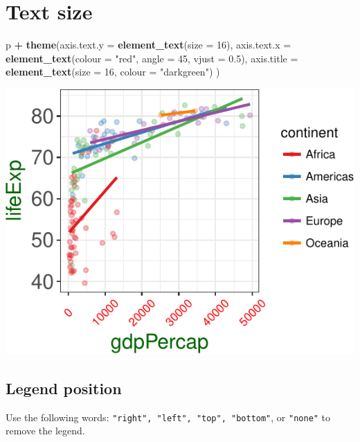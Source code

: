 \documentclass[12pt,]{krantz}
\makeatletter
\newenvironment{Shaded}{\begin{snugshade}}{\end{snugshade}}
\newcommand{\DataTypeTok}[1]{\textcolor[rgb]{0.13,0.29,0.53}{#1}}
\newcommand{\DecValTok}[1]{\textcolor[rgb]{0.00,0.00,0.81}{#1}}
\newcommand{\FloatTok}[1]{\textcolor[rgb]{0.00,0.00,0.81}{#1}}
\newcommand{\KeywordTok}[1]{\textcolor[rgb]{0.13,0.29,0.53}{\textbf{#1}}}
\newcommand{\NormalTok}[1]{#1}
\newcommand{\OperatorTok}[1]{\textcolor[rgb]{0.81,0.36,0.00}{\textbf{#1}}}
\newcommand{\StringTok}[1]{\textcolor[rgb]{0.31,0.60,0.02}{#1}}
\newenvironment{kframe}{%
\medskip{}
\setlength{\fboxsep}{.8em}
 \def\at@end@of@kframe{}%
 \ifinner\ifhmode%
  \def\at@end@of@kframe{\end{minipage}}%
  \begin{minipage}{\columnwidth}%
 \fi\fi%
 \def\FrameCommand##1{\hskip\@totalleftmargin \hskip-\fboxsep
 \colorbox{shadecolor}{##1}\hskip-\fboxsep
     \hskip-\linewidth \hskip-\@totalleftmargin \hskip\columnwidth}%
 \MakeFramed {\advance\hsize-\width
   \@totalleftmargin\z@ \linewidth\hsize
   \@setminipage}}%
 {\par\unskip\endMakeFramed%
 \at@end@of@kframe}
\renewenvironment{Shaded}{\begin{kframe}}{\end{kframe}}
\theoremstyle{definition}
\theoremstyle{definition}
\theoremstyle{definition}
\theoremstyle{remark}
\makeatother
\begin{document}
\hypertarget{text-size}{%
\section{Text size}\label{text-size}}

\begin{Shaded}
\begin{Highlighting}[]
\NormalTok{p }\OperatorTok{+}
\StringTok{  }\KeywordTok{theme}\NormalTok{(}\DataTypeTok{axis.text.y =} \KeywordTok{element_text}\NormalTok{(}\DataTypeTok{size =} \DecValTok{16}\NormalTok{),}
        \DataTypeTok{axis.text.x =} \KeywordTok{element_text}\NormalTok{(}\DataTypeTok{colour =} \StringTok{"red"}\NormalTok{, }\DataTypeTok{angle =} \DecValTok{45}\NormalTok{, }\DataTypeTok{vjust =} \FloatTok{0.5}\NormalTok{),}
        \DataTypeTok{axis.title =} \KeywordTok{element_text}\NormalTok{(}\DataTypeTok{size =} \DecValTok{16}\NormalTok{, }\DataTypeTok{colour =} \StringTok{"darkgreen"}\NormalTok{)}
\NormalTok{        )}
\end{Highlighting}
\end{Shaded}

\includegraphics{05_fine_tuning_plots_files/figure-latex/unnamed-chunk-19-1.pdf}

\hypertarget{legend-position}{%
\subsection{Legend position}\label{legend-position}}

Use the following words: \texttt{"right",\ "left",\ "top",\ "bottom"},
or \texttt{"none"} to remove the legend.
\end{document}
